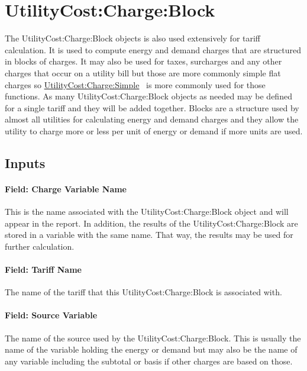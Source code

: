 \section{UtilityCost:Charge:Block}\label{utilitycostchargeblock}

The UtilityCost:Charge:Block objects is also used extensively for tariff calculation. It is used to compute energy and demand charges that are structured in blocks of charges. It may also be used for taxes, surcharges and any other charges that occur on a utility bill but those are more commonly simple flat charges so \hyperref[utilitycostchargesimple]{UtilityCost:Charge:Simple} ~is more commonly used for those functions. As many UtilityCost:Charge:Block objects as needed may be defined for a single tariff and they will be added together. Blocks are a structure used by almost all utilities for calculating energy and demand charges and they allow the utility to charge more or less per unit of energy or demand if more units are used.

\subsection{Inputs}\label{inputs-067}

\paragraph{Field: Charge Variable Name}\label{field-charge-variable-name}

This is the name associated with the UtilityCost:Charge:Block object and will appear in the report. In addition, the results of the UtilityCost:Charge:Block are stored in a variable with the same name. That way, the results may be used for further calculation.

\paragraph{Field: Tariff Name}\label{field-tariff-name}

The name of the tariff that this UtilityCost:Charge:Block is associated with.

\paragraph{Field: Source Variable}\label{field-source-variable}

The name of the source used by the UtilityCost:Charge:Block. This is usually the name of the variable holding the energy or demand but may also be the name of any variable including the subtotal or basis if other charges are based on those.

